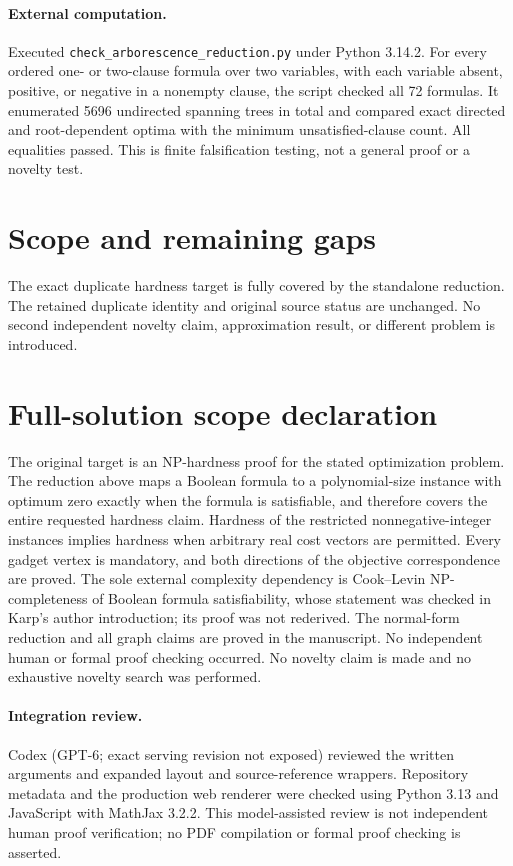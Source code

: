 \documentclass[11pt]{article}
\begin{document}
\paragraph{External computation.} Executed \texttt{check\_arborescence\_reduction.py} under Python 3.14.2. For every ordered one- or two-clause formula over two variables, with each variable absent, positive, or negative in a nonempty clause, the script checked all 72 formulas. It enumerated 5696 undirected spanning trees in total and compared exact directed and root-dependent optima with the minimum unsatisfied-clause count. All equalities passed. This is finite falsification testing, not a general proof or a novelty test.
\section{Scope and remaining gaps}
The exact duplicate hardness target is fully covered by the standalone reduction. The retained duplicate identity and original source status are unchanged. No second independent novelty claim, approximation result, or different problem is introduced.
\section{Full-solution scope declaration}
The original target is an NP-hardness proof for the stated optimization problem.
The reduction above maps a Boolean formula to a polynomial-size instance with
optimum zero exactly when the formula is satisfiable, and therefore covers the
entire requested hardness claim. Hardness of the restricted nonnegative-integer
instances implies hardness when arbitrary real cost vectors are permitted. Every
gadget vertex is mandatory, and both directions of the objective correspondence
are proved. The sole external complexity dependency is Cook--Levin NP-completeness
of Boolean formula satisfiability, whose statement was checked in Karp's author
introduction; its proof was not rederived. The normal-form reduction and all graph
claims are proved in the manuscript. No independent human or formal proof checking
occurred. No novelty claim is made and no exhaustive novelty search was performed.
\paragraph{Integration review.} Codex (GPT-6; exact serving revision not exposed) reviewed the written arguments and expanded layout and source-reference wrappers. Repository metadata and the production web renderer were checked using Python 3.13 and JavaScript with MathJax 3.2.2. This model-assisted review is not independent human proof verification; no PDF compilation or formal proof checking is asserted.
\end{document}
